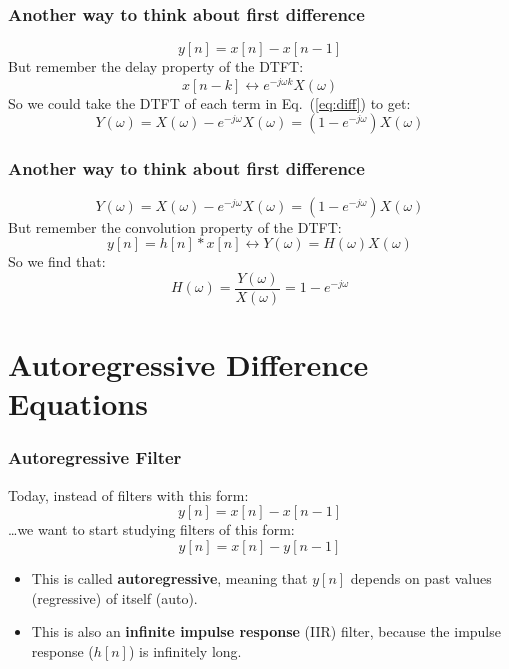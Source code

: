 \documentclass{beamer}
\begin{document}
\begin{frame}
  \frametitle{Another way to think about first difference}

  \begin{equation}
    y[n] = x[n]-x[n-1]
    \label{eq:diff}
  \end{equation}
  But remember the delay property of the DTFT:
  \begin{displaymath}
    x[n-k] \leftrightarrow e^{-j\omega k}X(\omega)
  \end{displaymath}
  So we could take the DTFT of each term in Eq.~(\ref{eq:diff}) to
  get:
  \begin{displaymath}
    Y(\omega) = X(\omega) - e^{-j\omega}X(\omega) = \left(1-e^{-j\omega}\right)X(\omega)
  \end{displaymath}
\end{frame}

\begin{frame}
  \frametitle{Another way to think about first difference}

  \begin{displaymath}
    Y(\omega) = X(\omega) - e^{-j\omega}X(\omega) = \left(1-e^{-j\omega}\right)X(\omega)
  \end{displaymath}
  But remember the convolution property of the DTFT:
  \begin{displaymath}
    y[n]=h[n]\ast x[n] \leftrightarrow Y(\omega) = H(\omega)X(\omega)
  \end{displaymath}
  So we find that:
  \begin{displaymath}
    H(\omega)=\frac{Y(\omega)}{X(\omega)} = 1-e^{-j\omega}
  \end{displaymath}
\end{frame}

\section[Autoregressive]{Autoregressive Difference Equations}
\setcounter{subsection}{1}

\begin{frame}
  \frametitle{Autoregressive Filter}

  Today, instead of filters with this form:
  \begin{displaymath}
    y[n] = x[n]-x[n-1]
  \end{displaymath}
  \ldots we want to start studying filters of this form:
  \begin{displaymath}
    y[n] = x[n]-y[n-1]
  \end{displaymath}
  \begin{itemize}
  \item This is called {\bf autoregressive}, meaning that $y[n]$ depends on
    past values (regressive) of itself (auto).
  \item This is also an {\bf infinite impulse response} (IIR) filter, because
    the impulse response ($h[n]$) is infinitely long.
  \end{itemize}
\end{frame}
    
\end{document}
